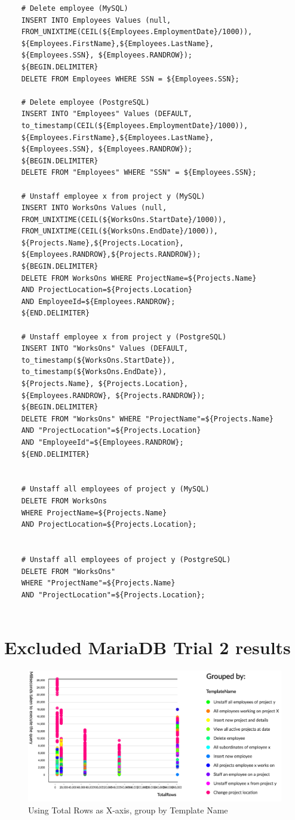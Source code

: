 \documentclass[12pt]{report}
\begin{document}
\begin{spacing}{1.9}
\begin{verbatim}
	# Delete employee (MySQL)
	INSERT INTO Employees Values (null,
	FROM_UNIXTIME(CEIL(${Employees.EmploymentDate}/1000)),
	${Employees.FirstName},${Employees.LastName}, 
	${Employees.SSN}, ${Employees.RANDROW});
	${BEGIN.DELIMITER}
	DELETE FROM Employees WHERE SSN = ${Employees.SSN};
	
	# Delete employee (PostgreSQL)
	INSERT INTO "Employees" Values (DEFAULT,
	to_timestamp(CEIL(${Employees.EmploymentDate}/1000)),
	${Employees.FirstName},${Employees.LastName}, 
	${Employees.SSN}, ${Employees.RANDROW});
	${BEGIN.DELIMITER}
	DELETE FROM "Employees" WHERE "SSN" = ${Employees.SSN};
	
	# Unstaff employee x from project y (MySQL)
	INSERT INTO WorksOns Values (null,
	FROM_UNIXTIME(CEIL(${WorksOns.StartDate}/1000)),
	FROM_UNIXTIME(CEIL(${WorksOns.EndDate}/1000)),
	${Projects.Name},${Projects.Location},
	${Employees.RANDROW},${Projects.RANDROW});
	${BEGIN.DELIMITER}
	DELETE FROM WorksOns WHERE ProjectName=${Projects.Name} 
	AND ProjectLocation=${Projects.Location} 
	AND EmployeeId=${Employees.RANDROW};
	${END.DELIMITER}
	
	# Unstaff employee x from project y (PostgreSQL)
	INSERT INTO "WorksOns" Values (DEFAULT,
	to_timestamp(${WorksOns.StartDate}),
	to_timestamp(${WorksOns.EndDate}),
	${Projects.Name}, ${Projects.Location},
	${Employees.RANDROW}, ${Projects.RANDROW});
	${BEGIN.DELIMITER}
	DELETE FROM "WorksOns" WHERE "ProjectName"=${Projects.Name} 
	AND "ProjectLocation"=${Projects.Location} 
	AND "EmployeeId"=${Employees.RANDROW};
	${END.DELIMITER}
	
	
	# Unstaff all employees of project y (MySQL)
	DELETE FROM WorksOns 
	WHERE ProjectName=${Projects.Name} 
	AND ProjectLocation=${Projects.Location};
	
	
	# Unstaff all employees of project y (PostgreSQL)
	DELETE FROM "WorksOns" 
	WHERE "ProjectName"=${Projects.Name}  
	AND "ProjectLocation"=${Projects.Location};
	
	\end{verbatim}
	
	\chapter{Excluded MariaDB Trial 2 results}
	\begin{figure}[H]
		\centering
		\includegraphics[width=\textwidth]{maria2-temp.png}
		\caption{Using Total Rows as X-axis, group by Template Name}
		

\end{figure}
\end{spacing}
\end{document}
